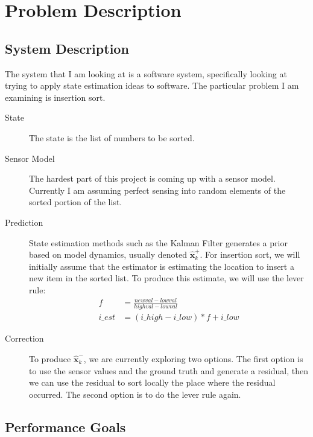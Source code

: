 \section{Problem Description}  \label{sec:physys}


\subsection{System Description}

The system that I am looking at is a software system, specifically
looking at trying to apply state estimation ideas to software. The
particular problem I am examining is insertion sort.

\begin{description}
\item[State] The state is the list of numbers to be sorted.
\item[Sensor Model] The hardest part of this project is coming up with a
  sensor model. Currently I am assuming perfect sensing into random
  elements of the sorted portion of the list.
\item[Prediction] State estimation methods such as the Kalman Filter
  generates a prior based on model dynamics, usually denoted $
  \hat{\mathbf{x}}_{k}^{+}$. For insertion sort, we will initially
  assume that the estimator is estimating the location to insert a new item
  in the sorted list. To produce this estimate, we will use the lever
  rule:
  \begin{align}
    f &= \frac{newval - lowval}{highval - lowval} \\
    i\_est &= (i\_high - i\_low)*f + i\_low
  \end{align}  
\item[Correction] To produce $\hat{\mathbf{x}}_{k}^{-}$, we are
  currently exploring two options. The first option is to use the
  sensor values and the ground truth and generate a residual, then we
  can use the residual to sort locally the place where the residual
  occurred. The second option is to do the lever rule again.
\end{description}

\subsection{Performance Goals} \label{subsec:perfgoals}

